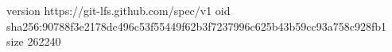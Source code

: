 version https://git-lfs.github.com/spec/v1
oid sha256:90788f3e2178dc496c53f55449f62b3f7237996c625b43b59cc93a758c928fb1
size 262240
